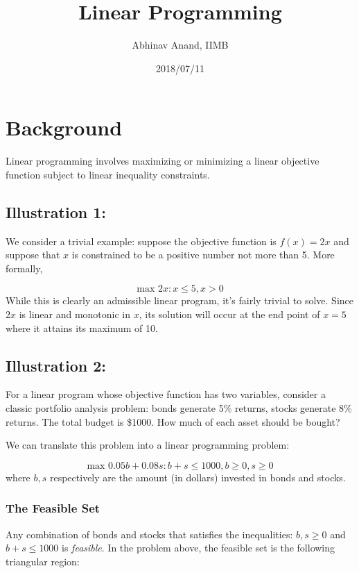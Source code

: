 \documentclass[11pt,]{article}
\title{Linear Programming}
\author{Abhinav Anand, IIMB}
\date{2018/07/11}
\begin{document}
\maketitle

\section{Background}\label{background}

Linear programming involves maximizing or minimizing a linear objective
function subject to linear inequality constraints.

\subsection{Illustration 1:}\label{illustration-1}

We consider a trivial example: suppose the objective function is
\(f(x) = 2x\) and suppose that \(x\) is constrained to be a positive
number not more than 5. More formally,

\[
\text{max } 2x: x\leq 5, x>0
\] While this is clearly an admissible linear program, it's fairly
trivial to solve. Since \(2x\) is linear and monotonic in \(x\), its
solution will occur at the end point of \(x=5\) where it attains its
maximum of 10.

\subsection{Illustration 2:}\label{illustration-2}

For a linear program whose objective function has two variables,
consider a classic portfolio analysis problem: bonds generate 5\%
returns, stocks generate 8\% returns. The total budget is \$1000. How
much of each asset should be bought?

We can translate this problem into a linear programming problem:

\[
\text{max } 0.05b+0.08s: b+s\leq 1000, b \geq 0, s \geq 0
\] where \(b, s\) respectively are the amount (in dollars) invested in
bonds and stocks.

\subsubsection{The Feasible Set}\label{the-feasible-set}

Any combination of bonds and stocks that satisfies the inequalities:
\(b ,s \geq 0\) and \(b+s\leq 1000\) is \emph{feasible}. In the problem
above, the feasible set is the following triangular region:
\end{document}
